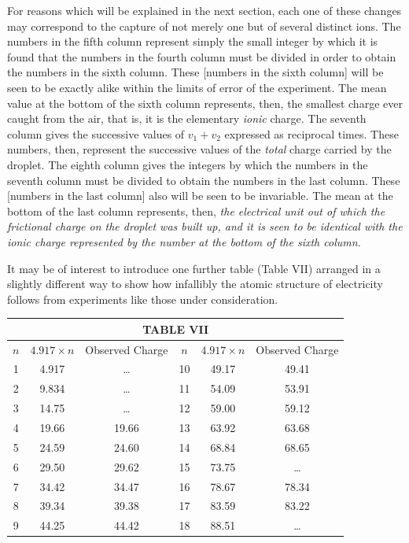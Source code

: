 For reasons which will be explained in the next section, each one of
these changes may correspond to the capture of not merely one but of
several distinct ions. The numbers in the fifth column represent simply
the small integer by which it is found that the numbers in the fourth
column must be divided in order to obtain the numbers in the sixth
column. These {[}numbers in the sixth column{]} will be seen to be
exactly alike within the limits of error of the experiment. The mean
value at the bottom of the sixth column represents, then, the smallest
charge ever caught from the air, that is, it is the elementary
\emph{ionic} charge. The seventh column gives the successive values of
$v_1 + v_2$ expressed as reciprocal times. These numbers,
then, represent the successive values of the \emph{total} charge carried
by the droplet. The eighth column gives the integers by which the
numbers in the seventh column must be divided to obtain the numbers in
the last column. These {[}numbers in the last column{]} also will be
seen to be invariable. The mean at the bottom of the last column
represents, then, \emph{the electrical unit out of which the frictional
charge on the droplet was built up, and it is seen to be identical with
the ionic charge represented by the number at the bottom of the sixth
column.}

It may be of interest to introduce one further table (Table VII)
arranged in a slightly different way to show how infallibly the atomic
structure of electricity follows from experiments like those under
consideration.

\begin{center}
\begin{tabular}{c|c|c|c|c|c}
\hline
\multicolumn{6}{c}{TABLE VII}\\
\hline
$n$ & $4.917\!\times\!{n}$ & Observed Charge & $n$ & $4.917\!\times\!{n}$ & Observed Charge\\
\hline
1 & 4.917 & \ldots & 10 & 49.17 & 49.41\\
2 & 9.834 & \ldots & 11 & 54.09 & 53.91\\
3 & 14.75 & \ldots & 12 & 59.00 & 59.12\\
4 & 19.66 & 19.66  & 13 & 63.92 & 63.68\\
5 & 24.59 & 24.60  & 14 & 68.84 & 68.65\\
6 & 29.50 & 29.62  & 15 & 73.75 & \ldots\\
7 & 34.42 & 34.47  & 16 & 78.67 & 78.34\\
8 & 39.34 & 39.38  & 17 & 83.59 & 83.22\\
9 & 44.25 & 44.42  & 18 & 88.51 & \ldots\\
\hline
\end{tabular}
\end{center}

